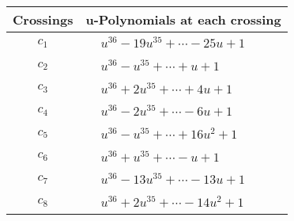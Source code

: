 \documentclass[1p]{elsarticle_modified}
\theoremstyle{definition}
\begin{document}
\begin{tabular}{m{50pt}|m{274pt}}
Crossings & \hspace{64pt}u-Polynomials at each crossing \\
\hline $$\begin{aligned}c_{1}\end{aligned}$$&$\begin{aligned}
&u^{36}-19 u^{35}+\cdots-25 u+1
\end{aligned}$\\
\hline $$\begin{aligned}c_{2}\end{aligned}$$&$\begin{aligned}
&u^{36}- u^{35}+\cdots+u+1
\end{aligned}$\\
\hline $$\begin{aligned}c_{3}\end{aligned}$$&$\begin{aligned}
&u^{36}+2 u^{35}+\cdots+4 u+1
\end{aligned}$\\
\hline $$\begin{aligned}c_{4}\end{aligned}$$&$\begin{aligned}
&u^{36}-2 u^{35}+\cdots-6 u+1
\end{aligned}$\\
\hline $$\begin{aligned}c_{5}\end{aligned}$$&$\begin{aligned}
&u^{36}- u^{35}+\cdots+16 u^2+1
\end{aligned}$\\
\hline $$\begin{aligned}c_{6}\end{aligned}$$&$\begin{aligned}
&u^{36}+u^{35}+\cdots- u+1
\end{aligned}$\\
\hline $$\begin{aligned}c_{7}\end{aligned}$$&$\begin{aligned}
&u^{36}-13 u^{35}+\cdots-13 u+1
\end{aligned}$\\
\hline $$\begin{aligned}c_{8}\end{aligned}$$&$\begin{aligned}
&u^{36}+2 u^{35}+\cdots-14 u^2+1
\end{aligned}$\\

\end{tabular}
\end{document}
